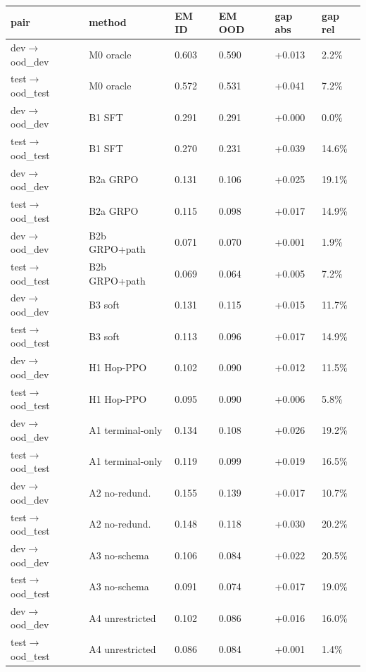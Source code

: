 \begin{tabular}{llllll}
\toprule
pair & method & EM ID & EM OOD & gap abs & gap rel \\
\midrule
dev$\rightarrow$ood\_dev & M0 oracle & 0.603 & 0.590 & +0.013 & 2.2\% \\
test$\rightarrow$ood\_test & M0 oracle & 0.572 & 0.531 & +0.041 & 7.2\% \\
dev$\rightarrow$ood\_dev & B1 SFT & 0.291 & 0.291 & +0.000 & 0.0\% \\
test$\rightarrow$ood\_test & B1 SFT & 0.270 & 0.231 & +0.039 & 14.6\% \\
dev$\rightarrow$ood\_dev & B2a GRPO & 0.131 & 0.106 & +0.025 & 19.1\% \\
test$\rightarrow$ood\_test & B2a GRPO & 0.115 & 0.098 & +0.017 & 14.9\% \\
dev$\rightarrow$ood\_dev & B2b GRPO+path & 0.071 & 0.070 & +0.001 & 1.9\% \\
test$\rightarrow$ood\_test & B2b GRPO+path & 0.069 & 0.064 & +0.005 & 7.2\% \\
dev$\rightarrow$ood\_dev & B3 soft & 0.131 & 0.115 & +0.015 & 11.7\% \\
test$\rightarrow$ood\_test & B3 soft & 0.113 & 0.096 & +0.017 & 14.9\% \\
dev$\rightarrow$ood\_dev & H1 Hop-PPO & 0.102 & 0.090 & +0.012 & 11.5\% \\
test$\rightarrow$ood\_test & H1 Hop-PPO & 0.095 & 0.090 & +0.006 & 5.8\% \\
dev$\rightarrow$ood\_dev & A1 terminal-only & 0.134 & 0.108 & +0.026 & 19.2\% \\
test$\rightarrow$ood\_test & A1 terminal-only & 0.119 & 0.099 & +0.019 & 16.5\% \\
dev$\rightarrow$ood\_dev & A2 no-redund. & 0.155 & 0.139 & +0.017 & 10.7\% \\
test$\rightarrow$ood\_test & A2 no-redund. & 0.148 & 0.118 & +0.030 & 20.2\% \\
dev$\rightarrow$ood\_dev & A3 no-schema & 0.106 & 0.084 & +0.022 & 20.5\% \\
test$\rightarrow$ood\_test & A3 no-schema & 0.091 & 0.074 & +0.017 & 19.0\% \\
dev$\rightarrow$ood\_dev & A4 unrestricted & 0.102 & 0.086 & +0.016 & 16.0\% \\
test$\rightarrow$ood\_test & A4 unrestricted & 0.086 & 0.084 & +0.001 & 1.4\% \\
\bottomrule
\end{tabular}
